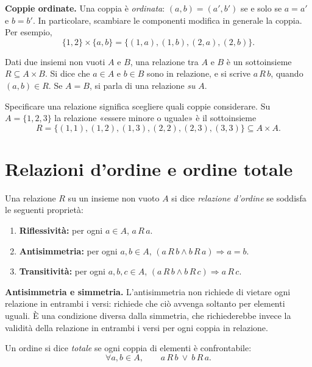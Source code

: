 \textbf{Coppie ordinate.} Una coppia è \emph{ordinata}: $(a,b)=(a',b')$ se e solo se $a=a'$ e $b=b'$. In particolare, scambiare le componenti modifica in generale la coppia. Per esempio,
\[
  \{1,2\}\times\{a,b\}
   =\{(1,a),(1,b),(2,a),(2,b)\}.
\]

\begin{definizione}[Relazione]
Dati due insiemi non vuoti $A$ e $B$, una relazione tra $A$ e $B$ è un sottoinsieme $R\subseteq A\times B$. Si dice che $a\in A$ e $b\in B$ sono in relazione, e si scrive $a\,R\,b$, quando $(a,b)\in R$. Se $A=B$, si parla di una relazione \emph{su} $A$.
\end{definizione}

\begin{esempio}
Specificare una relazione significa scegliere quali coppie considerare. Su $A=\{1,2,3\}$ la relazione «essere minore o uguale» è il sottoinsieme
\[
  R=\{(1,1),(1,2),(1,3),(2,2),(2,3),(3,3)\}\subseteq A\times A.
\]
\end{esempio}

\section{Relazioni d'ordine e ordine totale}

\begin{definizione}
Una relazione $R$ su un insieme non vuoto $A$ si dice \emph{relazione d'ordine} se soddisfa le seguenti proprietà:
\begin{enumerate}[label=(\alph*)]
  \item \textbf{Riflessività:} per ogni $a\in A$, $a\,R\,a$.
  \item \textbf{Antisimmetria:} per ogni $a,b\in A$, $(a\,R\,b\land b\,R\,a)\Rightarrow a=b$.
  \item \textbf{Transitività:} per ogni $a,b,c\in A$, $(a\,R\,b\land b\,R\,c)\Rightarrow a\,R\,c$.
\end{enumerate}
\end{definizione}

\textbf{Antisimmetria e simmetria.} L'antisimmetria non richiede di vietare ogni relazione in entrambi i versi: richiede che ciò avvenga soltanto per elementi uguali. È una condizione diversa dalla simmetria, che richiederebbe invece la validità della relazione in entrambi i versi per ogni coppia in relazione.

\begin{definizione}
Un ordine si dice \emph{totale} se ogni coppia di elementi è confrontabile:
\[
  \forall a,b\in A,\qquad a\,R\,b\ \lor\ b\,R\,a.
\]
\end{definizione}

